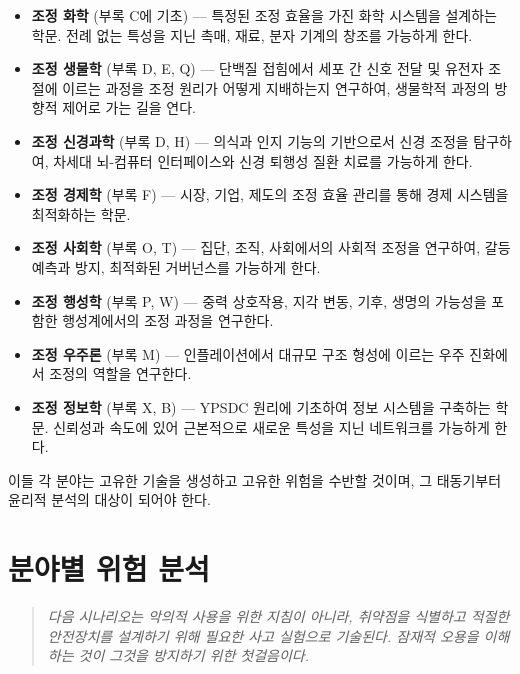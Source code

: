 \documentclass[12pt,a4paper]{article}
\theoremstyle{remark}
\begin{document}
	\begin{itemize}[leftmargin=*]
		\item \textbf{조정 화학} (부록 C에 기초) — 특정된 조정 효율을 가진 화학 시스템을 설계하는 학문. 전례 없는 특성을 지닌 촉매, 재료, 분자 기계의 창조를 가능하게 한다.
		
		\item \textbf{조정 생물학} (부록 D, E, Q) — 단백질 접힘에서 세포 간 신호 전달 및 유전자 조절에 이르는 과정을 조정 원리가 어떻게 지배하는지 연구하여, 생물학적 과정의 방향적 제어로 가는 길을 연다.
		
		\item \textbf{조정 신경과학} (부록 D, H) — 의식과 인지 기능의 기반으로서 신경 조정을 탐구하여, 차세대 뇌-컴퓨터 인터페이스와 신경 퇴행성 질환 치료를 가능하게 한다.
		
		\item \textbf{조정 경제학} (부록 F) — 시장, 기업, 제도의 조정 효율 관리를 통해 경제 시스템을 최적화하는 학문.
		
		\item \textbf{조정 사회학} (부록 O, T) — 집단, 조직, 사회에서의 사회적 조정을 연구하여, 갈등 예측과 방지, 최적화된 거버넌스를 가능하게 한다.
		
		\item \textbf{조정 행성학} (부록 P, W) — 중력 상호작용, 지각 변동, 기후, 생명의 가능성을 포함한 행성계에서의 조정 과정을 연구한다.
		
		\item \textbf{조정 우주론} (부록 M) — 인플레이션에서 대규모 구조 형성에 이르는 우주 진화에서 조정의 역할을 연구한다.
		
		\item \textbf{조정 정보학} (부록 X, B) — YPSDC 원리에 기초하여 정보 시스템을 구축하는 학문. 신뢰성과 속도에 있어 근본적으로 새로운 특성을 지닌 네트워크를 가능하게 한다.
	\end{itemize}
	
	이들 각 분야는 고유한 기술을 생성하고 고유한 위험을 수반할 것이며, 그 태동기부터 윤리적 분석의 대상이 되어야 한다.
	
	\section{분야별 위험 분석}
	\label{sec:risks}
	
	\begin{quote}
		\emph{다음 시나리오는 악의적 사용을 위한 지침이 아니라, 취약점을 식별하고 적절한 안전장치를 설계하기 위해 필요한 사고 실험으로 기술된다. 잠재적 오용을 이해하는 것이 그것을 방지하기 위한 첫걸음이다.}
	\end{quote}
	
\end{document}
